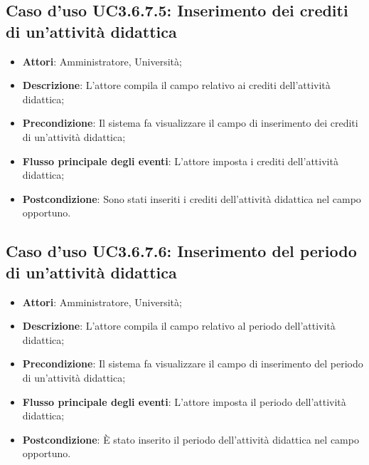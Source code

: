 \subsection{Caso d'uso \texorpdfstring{UC3.6.7.5}{UC3.6.7.5}: Inserimento dei crediti di un’attività didattica}
\begin{itemize}
	\item \textbf{Attori}: Amministratore, Università;
	\item \textbf{Descrizione}: L'attore compila il campo relativo ai crediti dell'attività didattica;
	
	\item \textbf{Precondizione}: Il sistema fa visualizzare il campo di inserimento dei crediti di un'attività didattica;
	
	\item \textbf{Flusso principale degli eventi}: L'attore imposta i crediti dell'attività didattica;
	
	\item \textbf{Postcondizione}: Sono stati inseriti i crediti dell'attività didattica nel campo opportuno.
	
\end{itemize}
\subsection{Caso d'uso \texorpdfstring{UC3.6.7.6}{UC3.6.7.6}: Inserimento del periodo di un’attività didattica}
\begin{itemize}
	\item \textbf{Attori}: Amministratore, Università;
	\item \textbf{Descrizione}: L'attore compila il campo relativo al periodo dell'attività didattica;
	
	\item \textbf{Precondizione}: Il sistema fa visualizzare il campo di inserimento del periodo di un'attività didattica;
	
	\item \textbf{Flusso principale degli eventi}: L'attore imposta il periodo dell'attività didattica;
	
	\item \textbf{Postcondizione}: È stato inserito il periodo dell'attività didattica nel campo opportuno.
	
\end{itemize}
